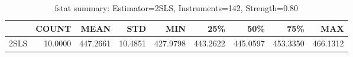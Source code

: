 \begin{table}[ht]
\centering
\caption{fstat summary: Estimator=2SLS, Instruments=142, Strength=0.80}
\begin{tabular}{lrrrrrrrr}
\toprule
 & COUNT & MEAN & STD & MIN & 25\% & 50\% & 75\% & MAX \\
\midrule
2SLS & 10.0000 & 447.2661 & 10.4851 & 427.9798 & 443.2622 & 445.0597 & 453.3350 & 466.1312 \\
\bottomrule
\end{tabular}
\end{table}
